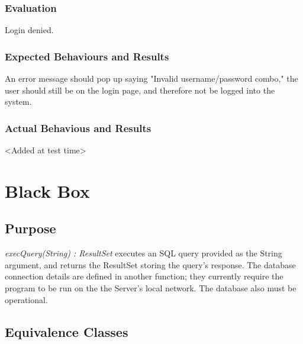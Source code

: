 \documentclass{article}
\begin{document}
\subsubsection{Evaluation}
Login denied.

\subsubsection{Expected Behaviours and Results}
An error message should pop up saying "Invalid username/password combo," the user should still be on the login page, and therefore not be logged into the system.

\subsubsection{Actual Behavious and Results}
<Added at test time>

\section{Black Box}
\subsection{Purpose}
\textit{execQuery(String) : ResultSet} executes an SQL query provided as the String argument, and returns the ResultSet storing the query's response.  The database connection details are defined in another function; they currently require the program to be run on the the Server's local network.  The database also must be operational.

\subsection{Equivalence Classes}
\end{document}
